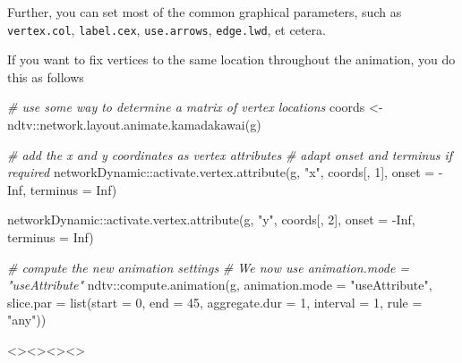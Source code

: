 \documentclass[
]{article}
\newenvironment{Shaded}{\begin{snugshade}}{\end{snugshade}}
\newcommand{\AttributeTok}[1]{\textcolor[rgb]{0.77,0.63,0.00}{#1}}
\newcommand{\CommentTok}[1]{\textcolor[rgb]{0.56,0.35,0.01}{\textit{#1}}}
\newcommand{\ConstantTok}[1]{\textcolor[rgb]{0.00,0.00,0.00}{#1}}
\newcommand{\DecValTok}[1]{\textcolor[rgb]{0.00,0.00,0.81}{#1}}
\newcommand{\FunctionTok}[1]{\textcolor[rgb]{0.00,0.00,0.00}{#1}}
\newcommand{\NormalTok}[1]{#1}
\newcommand{\OtherTok}[1]{\textcolor[rgb]{0.56,0.35,0.01}{#1}}
\newcommand{\SpecialCharTok}[1]{\textcolor[rgb]{0.00,0.00,0.00}{#1}}
\newcommand{\StringTok}[1]{\textcolor[rgb]{0.31,0.60,0.02}{#1}}
\begin{document}
Further, you can set most of the common graphical parameters, such as
\texttt{vertex.col}, \texttt{label.cex}, \texttt{use.arrows},
\texttt{edge.lwd}, et cetera.

If you want to fix vertices to the same location throughout the
animation, you do this as follows

\begin{Shaded}
\begin{Highlighting}[]
\CommentTok{\# use some way to determine a matrix of vertex locations}
\NormalTok{coords }\OtherTok{\textless{}{-}}\NormalTok{ ndtv}\SpecialCharTok{::}\FunctionTok{network.layout.animate.kamadakawai}\NormalTok{(g)}

\CommentTok{\# add the x and y coordinates as vertex attributes}
\CommentTok{\# adapt onset and terminus if required}
\NormalTok{networkDynamic}\SpecialCharTok{::}\FunctionTok{activate.vertex.attribute}\NormalTok{(g, }\StringTok{"x"}\NormalTok{, coords[, }\DecValTok{1}\NormalTok{],}
                                          \AttributeTok{onset =} \SpecialCharTok{{-}}\ConstantTok{Inf}\NormalTok{, }\AttributeTok{terminus =} \ConstantTok{Inf}\NormalTok{)}

\NormalTok{networkDynamic}\SpecialCharTok{::}\FunctionTok{activate.vertex.attribute}\NormalTok{(g, }\StringTok{"y"}\NormalTok{, coords[, }\DecValTok{2}\NormalTok{],}
                                          \AttributeTok{onset =} \SpecialCharTok{{-}}\ConstantTok{Inf}\NormalTok{, }\AttributeTok{terminus =} \ConstantTok{Inf}\NormalTok{)}

\CommentTok{\# compute the new animation settings}
\CommentTok{\# We now use \textasciigrave{}animation.mode = "useAttribute"\textasciigrave{}}
\NormalTok{ndtv}\SpecialCharTok{::}\FunctionTok{compute.animation}\NormalTok{(g, }\AttributeTok{animation.mode =} \StringTok{"useAttribute"}\NormalTok{,}
                        \AttributeTok{slice.par =} \FunctionTok{list}\NormalTok{(}\AttributeTok{start =} \DecValTok{0}\NormalTok{, }\AttributeTok{end =} \DecValTok{45}\NormalTok{,}
                                         \AttributeTok{aggregate.dur =} \DecValTok{1}\NormalTok{,}
                                         \AttributeTok{interval =} \DecValTok{1}\NormalTok{, }\AttributeTok{rule =} \StringTok{"any"}\NormalTok{))}
\end{Highlighting}
\end{Shaded}

\textless{}\br\textgreater\textless{}\br\textgreater\textless{}\br\textgreater\textless{}\br\textgreater{}
\end{document}
